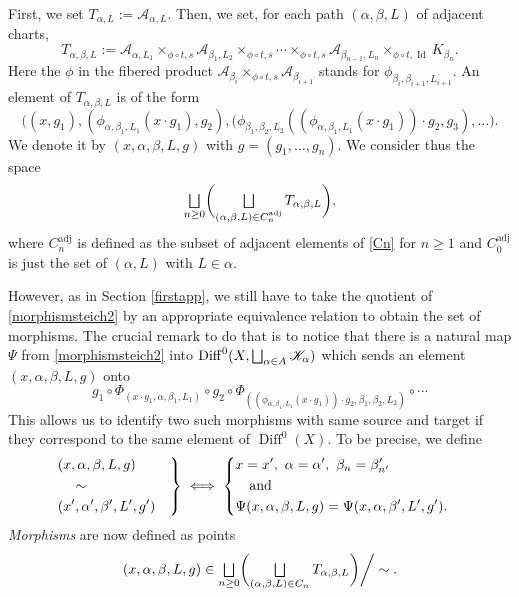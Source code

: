 \documentclass[10pt]{amsart}
\let\mathcal\mathscr
\let\oldbigsqcup\bigsqcup
\renewcommand{\bigsqcup}{\mathop{\textstyle\oldbigsqcup}\displaylimits}
\newcommand{\adj}{\mathrm{adj}}
\DeclareMathOperator{\Diff}{Diff}
\DeclareMathOperator{\Id}{Id}
\theoremstyle{plain}
\theoremstyle{definition}
\theoremstyle{remark}
\numberwithin{equation}{section}
\newcommand{\DK}{\Diff^0(X,\bigsqcup_{\alpha\in A}\mathcal K_\alpha)}
\let\uniondisjointe\bigsqcup
\begin{document}
First, we set $T_{\alpha, L}:=\mathcal A_{\alpha,L}$. Then, we set, for each path $(\alpha,\beta,L)$ of adjacent charts,%
\begin{equation}
\label{morphismsteich1}
T_{\alpha,\beta,L}:=\mathcal A_{\alpha, L_1}\times_{\phi\circ t,s} \mathcal A_{\beta_1,L_2}\times_{\phi\circ t,s}\cdots\times_{\phi\circ t,s} \mathcal A_{\beta_{n-1},L_n}\times_{\phi\circ t,\Id}K_{\beta_n}.
\end{equation}
Here the $\phi$ in the fibered product $\mathcal A_{\beta_i}\times_{\phi\circ t,s}\mathcal A_{\beta_{i+1}}$ stands for $\phi_{\beta_{i},\beta_{i+1}, L_{i+1}}$. An element of $T_{\alpha, \beta, L}$ is of the form
\begin{equation}
\label{elementT}
\Big ((x,g_1),(\phi_{\alpha,\beta_1,L_1}(x\cdot g_1),g_2),(\phi_{\beta_1,\beta_2,L_2}((\phi_{\alpha,\beta_1,L_1}(x\cdot g_1))\cdot g_2,g_3),\hdots \Big ).
\end{equation}
We denote it by $(x,\alpha,\beta,L,g)$ with $g=(g_1,\hdots,g_n)$. We consider thus the space
\begin{equation}
\label{morphismsteich2}
\uniondisjointe_{n\geq 0}\biggl (\uniondisjointe_{(\alpha,\beta, L) \in C^{\adj}_{n}} T_{\alpha,\beta, L}\biggr),
\end{equation}
where $C^{\adj}_n$ is defined as the subset of adjacent elements of \eqref{Cn} for $n\geq 1$ and $C^{\adj}_0$ is just the set of $(\alpha, L)$ with $L\in\alpha$.

However, as in Section \ref{firstapp}, we still have to take the quotient of \eqref{morphismsteich2} by an appropriate equivalence relation to obtain the set of morphisms. The crucial remark to do that is to notice that there is a natural map $\Psi$ from \eqref{morphismsteich2} into $\DK$ which sends an element $(x,\alpha,\beta,L,g)$ onto
\begin{equation}
\label{elementDiff}
g_1\circ \Phi_{(x\cdot g_1,\alpha,\beta_1, L_1)}\circ g_2\circ \Phi_{((\phi_{\alpha,\beta_1,L_1}(x\cdot g_1))\cdot g_2,\beta_1,\beta_2, L_2)}\circ\cdots
\end{equation}
This allows us to identify two such morphisms with same source and target if they correspond to the same element of $\Diff^0(X)$. To be precise, we define
\begin{equation}
\label{morphismsteich3}
\left .
\begin{aligned}
&(x,\alpha,\beta,L,g)\cr
&\quad\sim\cr
&(x',\alpha',\beta',L',g')
\end{aligned}
\right \}\iff\left\{
\begin{aligned}
&x=x',\ \alpha=\alpha',\ \beta_n=\beta'_{n'}\cr
&\quad\text{and}\cr
&\Psi(x,\alpha,\beta,L,g)=\Psi(x,\alpha,\beta',L',g').
\end{aligned}
\right .
\end{equation}
\emph{Morphisms} are now defined as points
\begin{equation}
\label{morphismsteich4}
(x,\alpha,\beta,L,g)\in\uniondisjointe_{n\geq 0}\biggl (\uniondisjointe_{(\alpha,\beta,L)\in C_{n}}T_{\alpha,\beta, L}\biggr )\bigg /\sim.
\end{equation}
\end{document}
